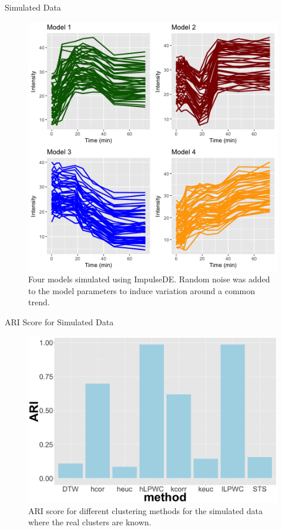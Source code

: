 \documentclass[10pt]{beamer}
\begin{document}
\begin{frame}{Simulated Data}
\begin{figure}
     \includegraphics[width=0.65\linewidth]{Simulation_plot.png}
      \caption{Four models simulated using ImpulseDE. Random noise was added to the model parameters to induce variation around a common trend.}
       \label{fig:simdata}
    \end{figure}
\end{frame}



\begin{frame}{ARI Score for Simulated Data}
\begin{figure}
     \includegraphics[width=0.7\linewidth]{ARI-Impulse.png}
      \caption{ARI score for different clustering methods for the simulated data where the real clusters are known.}
       \label{fig:ariscore}
    \end{figure}

\end{frame}
\end{document}
